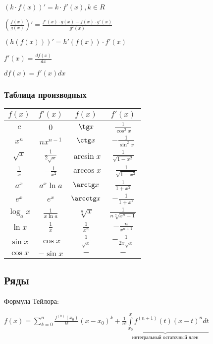 $ (k\cdot f(x))' = k\cdot f'(x), k \in R $

$ \left(\frac{f(x)}{g(x)}\right)' = \frac{f'(x)\cdot g(x) - f(x)\cdot g'(x)}{g^2(x)} $

$ (h(f(x)))' = h'(f(x)) \cdot f'(x) $

$ f'(x) = \frac{df(x)}{dx} $

$ df(x) = f'(x) dx $

\subsubsection{Таблица производных}

\begin{tabu}[t]{||c|c||c|c||}
	\hline
		$ f(x) $ & $ f'(x) $ & $ f(x) $ &  $ f'(x) $ \\
	\hline
		$ c $ & $ 0 $ & $ \tg x $ &  $ \frac{1}{\cos^2 x} $ \\
	\hline
		$ x^n $ & $ nx^{n-1} $ & $ \ctg x $ &  $ -\frac{1}{\sin^2 x} $ \\
	\hline
		$ \sqrt{x} $ & $ \frac{1}{2\sqrt{x}} $ & $ \arcsin x $ &  $ \frac{1}{\sqrt{1-x^2}} $ \\
	\hline
		$ \frac{1}{x} $ & $ -\frac{1}{x^2} $ & $ \arccos x $ &  $ -\frac{1}{\sqrt{1-x^2}} $ \\
	\hline
		$ a^x $ & $ a^x \ln a $ & $ \arctg x $ &  $ \frac{1}{1+x^2} $ \\
	\hline
		$ e^x $ & $ e^x $ & $ \arcctg x $ &  $ -\frac{1}{1+x^2} $ \\
	\hline
		$ \log_a x $ & $ \frac{1}{x \ln a} $ & $ \sqrt[n]{x} $ &  $ \frac{1}{n\sqrt[n]{x^n-1}} $ \\
	\hline
		$ \ln x $ & $ \frac{1}{x} $ & $ \frac{1}{x^n} $ &  $ -\frac{n}{x^{n+1}} $ \\
	\hline
		$ \sin x $ & $ \cos x $ & $ \frac{1}{\sqrt{x}} $ &  $ -\frac{1}{2x\sqrt{x}} $ \\
	\hline
		$ \cos x $ & $ -\sin x $ & $ - $ &  $ - $ \\
	\hline
\end{tabu}

\subsection{Ряды}

Формула Тейлора:

$\displaystyle f(x) = \sum_{k=0}^n \frac{f^{(k)}(x_0)}{k!}(x-x_0)^k + \underbrace{\frac{1}{n!}\int\limits_{x_0}^x f^{(n+1)}(t)(x-t)^n dt}_{\text{интегральный остаточный член}} $

